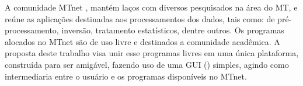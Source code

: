     A comunidade MTnet \cite{mtnet}, mantém laços com diversos pesquisados na área do MT, e reúne as aplicações destinadas aos processamentos dos dados, tais como:  de pré-processamento, inversão, tratamento estatísticos, dentre outros. Os programas alocados no MTnet são de uso livre e destinados a comunidade acadêmica. A proposta deste trabalho visa unir esse programas livres em uma única plataforma, construída para ser amigável, fazendo uso de uma GUI () simples, agindo como intermediaria entre o usuário e os programas disponíveis no MTnet.
    

    
    
     
    
